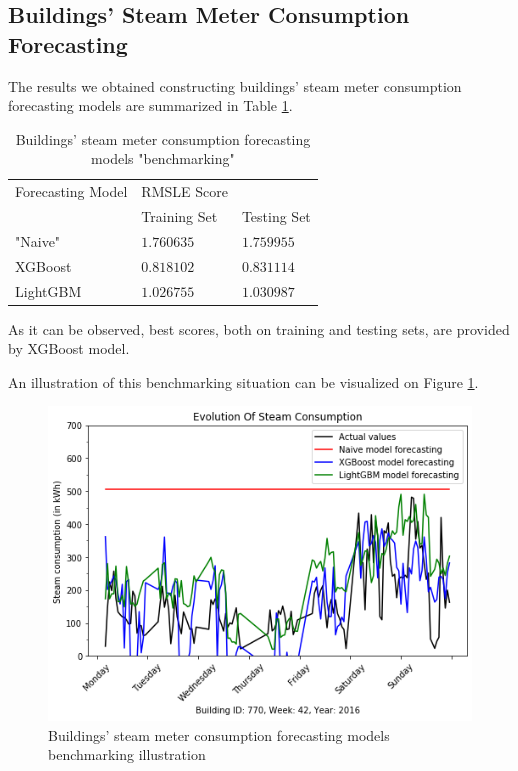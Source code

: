 \documentclass[twocolumn, switch]{article}
\begin{document}
\subsection{Buildings' Steam Meter Consumption Forecasting}

The results we obtained constructing buildings' steam meter consumption forecasting models are summarized in Table \ref{tab:steam_benchmarking}.

\begin{table}[H]
\caption{Buildings' steam meter consumption forecasting models "benchmarking"}
\centering
\begin{tabular}{lll}
\toprule
Forecasting Model & RMSLE Score & \\
& Training Set & Testing Set \\
\midrule
"Naive" & $1.760635$ & $1.759955$ \\
XGBoost & $0.818102$ & $0.831114$ \\
LightGBM & $1.026755$ & $1.030987$ \\
\bottomrule
\end{tabular}
\label{tab:steam_benchmarking}
\end{table}

As it can be observed, best scores, both on training and testing sets, are provided by XGBoost model.

An illustration of this benchmarking situation can be visualized on Figure \ref{fig:steam_benchmarking_illustration}.

\begin{figure}[H]
\centering
\includegraphics[scale=0.35]{../graphs/sample_steam_consumption_comparison}
\caption{Buildings' steam meter consumption forecasting models benchmarking illustration}
\label{fig:steam_benchmarking_illustration}
\end{figure}
\end{document}
